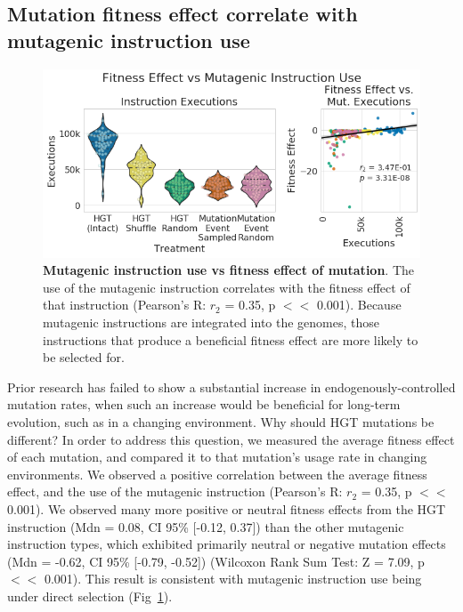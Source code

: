 \documentclass[PhD]{msu-thesis}
\begin{document}
\subsection{Mutation fitness effect correlate with mutagenic instruction use}
	\begin{figure}[h!]
	\begin{center}
	\includegraphics[width=0.95\columnwidth]{figures/HGT/mutagen_use_vs_fitness_effect.png}
	\caption{\textbf{Mutagenic instruction use vs fitness effect of mutation}. The use of the mutagenic instruction correlates with the fitness effect of that instruction (Pearson’s R: $r_2$ = 0.35,
	p $<<$ 0.001). Because mutagenic instructions are integrated into the genomes, those instructions that produce a beneficial fitness effect are more likely to be selected for.
	}\label{fig:mutagen_use_vs_fitness_effect}
	\end{center}
	\end{figure}

Prior research has failed to show a substantial increase in endogenously-controlled mutation rates, when such an increase would be beneficial for long-term evolution, such as in a changing environment\cite{clune_natural_2008}.
Why should HGT mutations be different? In order to address this question, we measured the average fitness effect of each mutation, and compared it to that mutation's usage rate in changing environments. We observed a positive correlation between the average fitness effect, and the use of the mutagenic instruction (Pearson's R: $r_{2}$ = 0.35, p $<<$ 0.001). We observed many more positive or neutral fitness effects from the HGT instruction (Mdn = 0.08, CI 95\% [-0.12, 0.37]) than the other mutagenic instruction types, which exhibited primarily neutral or negative mutation effects (Mdn = -0.62, CI 95\% [-0.79, -0.52]) (Wilcoxon Rank Sum Test: Z = 7.09, p $<<$ 0.001). This result is consistent with mutagenic instruction use being under direct selection (Fig~\ref{fig:mutagen_use_vs_fitness_effect}).
\end{document}
